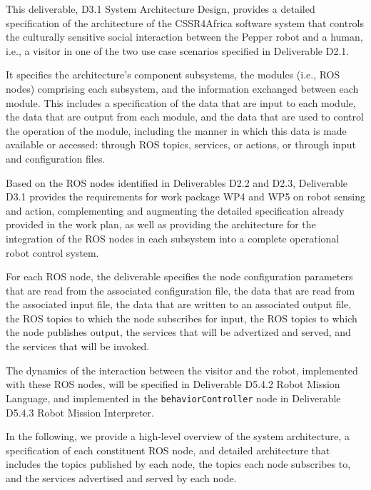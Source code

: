 \documentclass{CSSRforAfrica}
\begin{document}
This deliverable, D3.1 System Architecture Design,  provides a detailed specification of the architecture of the CSSR4Africa software system that controls the culturally sensitive social interaction between the Pepper robot and a human, i.e., a visitor in one of the two use case scenarios specified in Deliverable D2.1.   

It specifies the  architecture's component subsystems, the modules (i.e., ROS nodes) comprising each subsystem, and the information exchanged between each  module. This includes a specification of the data that are input to each module, the data that are output from each module, and the data that are used to control the operation of the module, including the manner in which this data is made available or accessed:  through ROS topics, services, or actions, or through input and configuration files.

Based on the ROS nodes identified in  Deliverables D2.2 and D2.3, Deliverable D3.1 provides the requirements for work package WP4 and WP5 on robot  sensing and action, complementing and augmenting the detailed specification already provided in the work plan, as well as providing the architecture for the integration of the ROS nodes in each subsystem into a complete operational robot control system. 

For each ROS node, the deliverable specifies the node configuration parameters that are read from the associated configuration file, the data that are read from the associated input file, the data that are written to an associated output file, the ROS topics to which the node subscribes for input,  the ROS topics to which the node publishes output, the services that will be advertized and served, and the services that will be invoked.

The dynamics of the interaction between the visitor and the robot, implemented with these  ROS nodes, will be specified in Deliverable D5.4.2 Robot Mission Language, and implemented in the {\small \verb+behaviorController+} node in Deliverable D5.4.3 Robot Mission Interpreter.

In the following, we provide a high-level overview of the system architecture, a specification of each constituent ROS node, and detailed architecture that includes the topics published by each node, the topics each node subscribes to, and the services advertised and served by each node.
\end{document}
